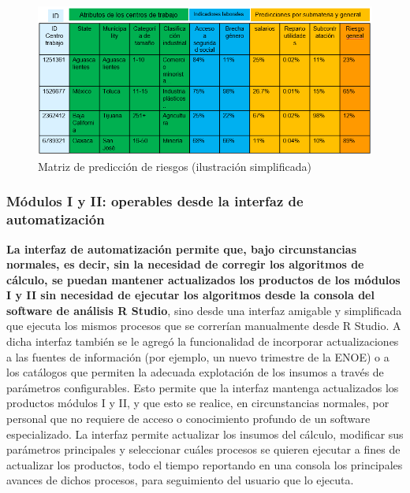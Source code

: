 \documentclass[
]{article}
\begin{document}
\begin{figure}
\includegraphics[width=11.61in]{images-1/02/MPR_simplificada} \caption{Matriz de predicción de riesgos (ilustración simplificada)}\label{fig:MPRsimplificada}
\end{figure}

\hypertarget{moduloIyIIexplicaciongeneral}{%
\subsubsection*{Módulos I y II: operables desde la interfaz de automatización}\label{moduloIyIIexplicaciongeneral}}

\textbf{La interfaz de automatización permite que, bajo circunstancias normales, es decir, sin la necesidad de corregir los algoritmos de cálculo, se puedan mantener actualizados los productos de los módulos I y II sin necesidad de ejecutar los algoritmos desde la consola del software de análisis R Studio}, sino desde una interfaz amigable y simplificada que ejecuta los mismos procesos que se correrían manualmente desde R Studio. A dicha interfaz también se le agregó la funcionalidad de incorporar actualizaciones a las fuentes de información (por ejemplo, un nuevo trimestre de la ENOE) o a los catálogos que permiten la adecuada explotación de los insumos a través de parámetros configurables. Esto permite que la interfaz mantenga actualizados los productos módulos I y II, y que esto se realice, en circunstancias normales, por personal que no requiere de acceso o conocimiento profundo de un software especializado. La interfaz permite actualizar los insumos del cálculo, modificar sus parámetros principales y seleccionar cuáles procesos se quieren ejecutar a fines de actualizar los productos, todo el tiempo reportando en una consola los principales avances de dichos procesos, para seguimiento del usuario que lo ejecuta.
\end{document}
